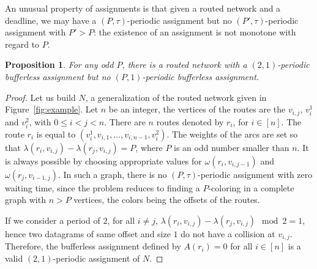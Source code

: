 \documentclass[a4paper,10pt]{article}
\newtheorem{proposition}{Proposition}
\begin{document}
      An unusual property of assignments is that given a routed network and a deadline, we may have a $(P,\tau)$-periodic assignment but no $(P',\tau)$-periodic assignment with $P' > P$: the existence of an assignment is not monotone with regard to $P$.

	\begin{proposition} \label{prop:monotonic}
	 For any odd $P$, there is a routed network with a $(2,1)$-periodic bufferless assignment but no $(P,1)$-periodic bufferless assignment.
	\end{proposition}

	\begin{proof}
      Let us build $N$, a generalization of the routed network given in Figure~\ref{fig:example}. 
      Let $n$ be an integer, the vertices of the routes are the $v_{i,j}$, $v_i^1$ and $v_i^2$, with $0 \leq i < j <n$. 
      There are $n$ routes denoted by $r_i$, for $i \in [n]$. The route $r_i$ is equal to $(v_i^1,v_{i,1},\dots,v_{i,n-1},v_i^2)$. The weights of the arcs are set so that $\lambda(r_i, v_{i,j}) - \lambda(r_j,v_{i,j})= P$, where $P$ is an odd number smaller than $n$. It is always possible by choosing appropriate values for $\omega(r_i,v_{i,j-1})$ and $\omega(r_j,v_{i-1,j})$. In such a graph, there is no $(P,\tau)$-periodic assignment with zero waiting time, since the problem reduces to finding a $P$-coloring in a complete graph with $n > P$ vertices, the colors being the offsets of the routes.

      If we consider a period of $2$, for all $i \neq j$, $\lambda(r_i, v_{i,j}) - \lambda(r_j, v_{i,j}) \mod 2 = 1$, hence two datagrams of same offset and size $1$ do not have a collision at $v_{i,j}$. Therefore, the bufferless assignment defined by $A(r_i) = 0$ for all $i \in [n]$ is a valid $(2,1)$-periodic assignment of $N$.      
\end{proof}
\end{document}
